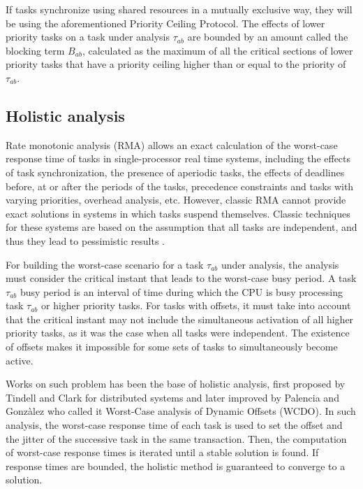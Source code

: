 \documentclass{article}
\begin{document}
If tasks synchronize using shared resources in a mutually exclusive way, they will be using the aforementioned Priority Ceiling Protocol. The effects of lower priority tasks on a task under analysis $\tau_{ab}$ are bounded by an amount called the blocking term $B_{ab}$, calculated as the maximum of all the critical sections of lower priority tasks that have a priority ceiling higher than or equal to the priority of $\tau_{ab}$.

\subsection{Holistic analysis}

Rate monotonic analysis (RMA) \cite{rm-dm} allows an exact calculation of the worst-case response time of tasks in single-processor real time systems, including the effects of task synchronization, the presence of aperiodic tasks, the effects of deadlines before, at or after the periods of the tasks, precedence constraints and tasks with varying priorities, overhead analysis, etc. However, classic RMA \cite{practitioner-common-data} cannot provide exact solutions in systems in which tasks suspend themselves. Classic techniques for these systems are based on the assumption that all tasks are independent, and thus they lead to pessimistic results \cite{pessimistic-rma}.

For building the worst-case scenario for a task $\tau_{ab}$ under analysis, the analysis must consider the critical instant that leads to the worst-case busy period. A task $\tau_{ab}$ busy period is an interval of time during which the CPU is busy processing task $\tau_{ab}$ or higher priority tasks. For tasks with offsets, it must take into account that the critical instant may not include the simultaneous activation of all higher priority tasks, as it was the case when all tasks were independent. The existence of offsets makes it impossible for some sets of tasks to simultaneously become active.

Works on such problem has been the base of holistic analysis, first proposed by Tindell and Clark \cite{tindell-offsets} for distributed systems and later improved by Palencia and Gonzàlez \cite{pessimistic-rma} who called it Worst-Case analysis of Dynamic Offsets (WCDO). In such analysis, the worst-case response time of each task is used to set the offset and the jitter of the successive task in the same transaction. Then, the computation of worst-case response times is iterated until a stable solution is found. If response times are bounded, the holistic method is guaranteed to converge to a solution.
\end{document}
